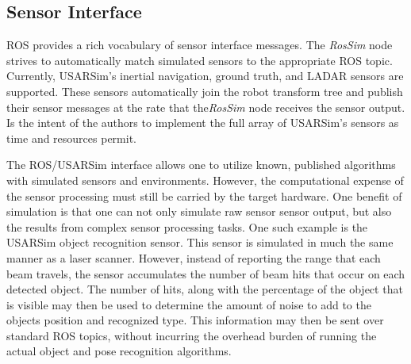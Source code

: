 \subsection*{Sensor Interface} 
ROS provides a rich vocabulary of sensor interface messages. The {\it RosSim} node strives to automatically match simulated sensors to the appropriate ROS topic. Currently, USARSim's inertial navigation, ground truth, and LADAR sensors are supported. These sensors automatically join the robot transform tree and publish their sensor messages at the rate that the{\it RosSim} node receives the sensor output. Is the intent of the authors to implement the full array of USARSim's sensors as time and resources permit.

The ROS/USARSim interface allows one to utilize known, published algorithms with simulated sensors and environments. However, the computational expense of the sensor processing must still be carried by the target hardware. One benefit of simulation is that one can not only simulate raw sensor sensor output, but also the results from complex sensor processing tasks. One such example is the USARSim object recognition sensor. This sensor  is simulated in much the same manner as a laser scanner. However, instead of reporting the range that each beam travels, the sensor accumulates the number of beam hits that occur on each detected object. The number of hits, along with the percentage of the object that is visible may then be used to determine the amount of noise to add to the objects position and recognized type. This information may then be sent over standard ROS topics, without incurring the overhead burden of running the actual object and pose recognition algorithms.
